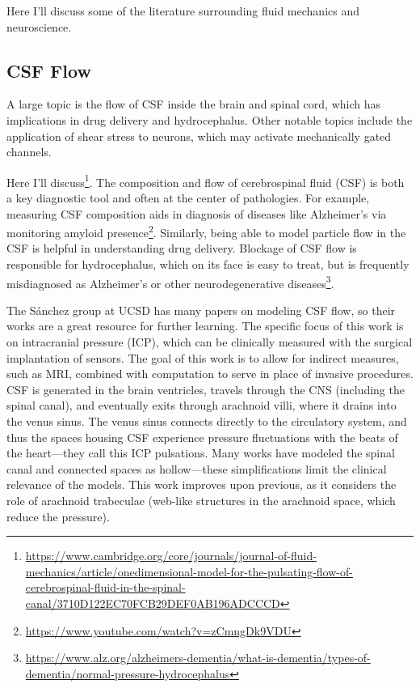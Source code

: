 Here I'll discuss some of the literature surrounding fluid mechanics and neuroscience. 

\subsection{CSF Flow}

A large topic is the flow of CSF inside the brain and spinal cord, which has implications in drug delivery and hydrocephalus. Other notable topics include the application of shear stress to neurons, which may activate mechanically gated channels.\newline

Here I'll discuss\footnote{\url{https://www.cambridge.org/core/journals/journal-of-fluid-mechanics/article/onedimensional-model-for-the-pulsating-flow-of-cerebrospinal-fluid-in-the-spinal-canal/3710D122EC70FCB29DEF0AB196ADCCCD}}. The composition and flow of cerebrospinal fluid (CSF) is both a key diagnostic tool and often at the center of pathologies. For example, measuring CSF composition aids in diagnosis of diseases like Alzheimer's via monitoring amyloid presence\footnote{\url{https://www.youtube.com/watch?v=zCmngDk9VDU}}. Similarly, being able to model particle flow in the CSF is helpful in understanding drug delivery. Blockage of CSF flow is responsible for hydrocephalus, which on its face is easy to treat, but is frequently misdiagnosed as Alzheimer's or other neurodegenerative diseases\footnote{\url{https://www.alz.org/alzheimers-dementia/what-is-dementia/types-of-dementia/normal-pressure-hydrocephalus}}.\newline

The S\'{a}nchez group at UCSD has many papers on modeling CSF flow, so their works are a great resource for further learning. The specific focus of this work is on intracranial pressure (ICP), which can be clinically measured with the surgical implantation of sensors. The goal of this work is to allow for indirect measures, such as MRI, combined with computation to serve in place of invasive procedures. CSF is generated in the brain ventricles, travels through the CNS (including the spinal canal), and eventually exits through arachnoid villi, where it drains into the venus sinus. The venus sinus connects directly to the circulatory system, and thus the spaces housing CSF experience pressure fluctuations with the beats of the heart---they call this ICP pulsations. Many works have modeled the spinal canal and connected spaces as hollow---these simplifications limit the clinical relevance of the models. This work improves upon previous, as it considers the role of arachnoid trabeculae (web-like structures in the arachnoid space, which reduce the pressure).\newline

